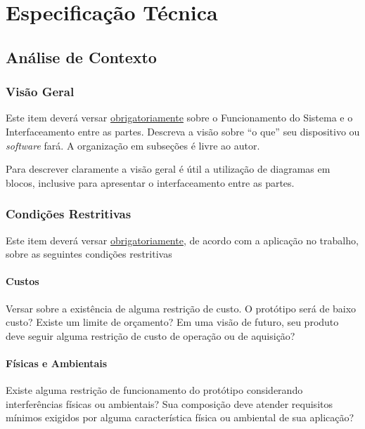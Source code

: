 \chapter{Especificação Técnica}
\label{cap:especificacao}

\section{Análise de Contexto}
\label{sec:analiseContexto}

\subsection{Visão Geral}

Este item deverá versar \underline{obrigatoriamente} sobre o Funcionamento do Sistema e o Interfaceamento entre as partes. Descreva a visão sobre “o que” seu dispositivo ou \textit{software} fará. A organização em subseções é livre ao autor.

Para descrever claramente a visão geral é útil a utilização de diagramas em blocos, inclusive para apresentar o interfaceamento entre as partes. 

\subsection{Condições Restritivas}

Este item deverá versar \underline{obrigatoriamente}, de acordo com a aplicação no trabalho, sobre as seguintes condições restritivas

\subsubsection{Custos}

Versar sobre a existência de alguma restrição de custo. O protótipo será de baixo custo? Existe um limite de orçamento? Em uma visão de futuro, seu produto deve seguir alguma restrição de custo de operação ou de aquisição?

\subsubsection{Físicas e Ambientais}

Existe alguma restrição de funcionamento do protótipo considerando interferências físicas ou ambientais? Sua composição deve atender requisitos mínimos exigidos por alguma característica física ou ambiental de sua aplicação?

